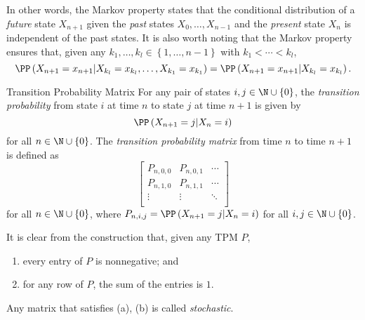 \documentclass[stat333]{subfiles}
\begin{document}
    \np In other words, the Markov property states that the conditional distribution of a \textit{future} state $X_{n+1}$ given the \textit{past} states $X_0,\ldots,X_{n-1}$ and the \textit{present} state $X_n$ is independent of the past states. It is also worth noting that the Markov property ensures that, given any $k_1,\ldots,k_l\in\left\lbrace 1,\ldots,n-1 \right\rbrace$ with $k_1<\cdots<k_l$,
    \begin{equation*}
        \PP\left( X_{n+1}=x_{n+1}|X_{k_l}=x_{k_l},\ldots,X_{k_1}=x_{k_1} \right) = \PP\left( X_{n+1}=x_{n+1}|X_{k_l}=x_{k_l} \right).
    \end{equation*}

    \begin{definition}{Transition Probability Matrix}{}
        For any pair of states $i,j\in\N\cup\left\lbrace 0 \right\rbrace$, the \emph{transition probability} from state $i$ at time $n$ to state $j$ at time $n+1$ is given by
        \begin{equation*}
            \PP\left( X_{n+1}=j|X_n=i \right)
        \end{equation*}
        for all $n\in\N\cup\left\lbrace 0 \right\rbrace$. The \emph{transition probability matrix} from time $n$ to time $n+1$ is defined as 
        \begin{equation*}
            \begin{bmatrix}
                P_{n,0,0} & P_{n,0,1} & \cdots \\
                P_{n,1,0} & P_{n,1,1} & \cdots \\
            	\vdots & \vdots & \ddots \\
            \end{bmatrix}
        \end{equation*}
        for all $n\in\N\cup\left\lbrace 0 \right\rbrace$, where $P_{n,i,j}=\PP\left( X_{n+1}=j|X_n=i \right)$ for all $i,j\in\N\cup\left\lbrace 0 \right\rbrace$.
    \end{definition}

    \clearpage
    \np It is clear from the construction that, given any TPM $P$,
    \begin{enumerate}
        \item every entry of $P$ is nonnegative; and
        \item for any row of $P$, the sum of the entries is $1$.
    \end{enumerate}
    Any matrix that satisfies (a), (b) is called \emph{stochastic}.
\end{document}
